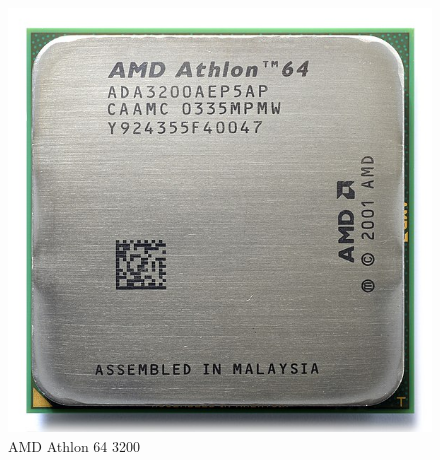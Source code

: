 \begin{figure}[htb]
	\centering
	\includegraphics[scale = 0.15]{Graphics/AMD_Athlon_64_3200+_ADA3200AEP5AP.jpg}
	\caption{AMD Athlon 64 3200}
	\label{fig:19}
\end{figure}




